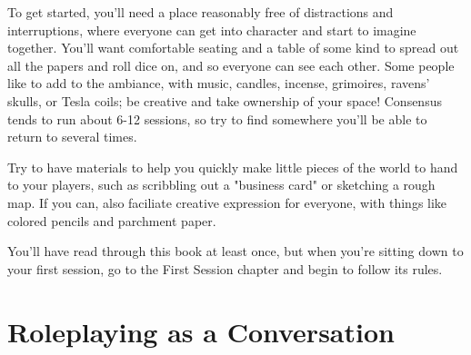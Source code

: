 \documentclass[
  oneside,
  statementpaper,
  9pt]{memoir}
\begin{document}
\begin{MC}

To get started, you’ll need a place reasonably free of distractions and interruptions, where everyone can get into character and start to imagine together. You’ll want comfortable seating and a table of some kind to spread out all the papers and roll dice on, and so everyone can see each other. Some people like to add to the ambiance, with music, candles, incense, grimoires, ravens’ skulls, or Tesla coils; be creative and take ownership of your space! Consensus tends to run about 6-12 sessions, so try to find somewhere you’ll be able to return to several times.

Try to have materials to help you quickly make little pieces of the world to hand to your players, such as scribbling out a "business card" or sketching a rough map. If you can, also faciliate creative expression for everyone,  with things like colored pencils and parchment paper.

You'll have read through this book at least once, but when you're sitting down to your first session, go to the First Session chapter and begin to follow its rules.

\end{MC}

\hypertarget{roleplaying-as-a-conversation}{%
\section{Roleplaying as a
Conversation}\label{roleplaying-as-a-conversation}}
\end{document}
